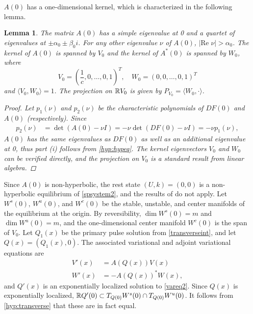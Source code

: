 \documentclass[10pt,reqno]{amsart}
\theoremstyle{plain}
\newtheorem{lemma}[theorem]{Lemma}
\theoremstyle{definition}
\theoremstyle{remark}
\numberwithin{theorem}{section}
\numberwithin{equation}{section}
\begin{document}
$A(0)$ has a one-dimensional kernel, which is characterized in the following lemma. 

\begin{lemma}\label{eigA0lemma}
The matrix $A(0)$ has a simple eigenvalue at 0 and a quartet of eigenvalues at $\pm \alpha_0 \pm \beta_0 i$. For any other eigenvalue $\nu$ of $A(0)$, $|\text{Re }\nu| > \alpha_0$. The kernel of $A(0)$ is spanned by $V_0$ and the kernel of $A^*(0)$ is spanned by $W_0$, where
\begin{equation}\label{V0W0}
V_0 = \left(\frac{1}{c}, 0, \dots, 0, 1\right)^T, \quad
W_0 = (0, 0, \dots, 0, 1)^T
\end{equation}
and $\langle V_0, W_0 \rangle = 1$. The projection on $\mathbb{R} V_0$ is given by $P_{V_0} = \langle W_0, \cdot \rangle$.
\begin{proof}
Let $p_1(\nu)$ and $p_2(\nu)$ be the characteristic polynomials of $DF(0)$ and $A(0)$ (respectively). Since
\begin{align*}
p_2(\nu) &= \det(A(0) - \nu I) = -\nu \det(DF(0) - \nu I) = -\nu p_1(\nu),
\end{align*}
$A(0)$ has the same eigenvalues as $DF(0)$ as well as an additional eigenvalue at 0, thus part (i) follows from \cref{hyp:hypeq}. The kernel eigenvectors $V_0$ and $W_0$ can be verified directly, and the projection on $V_0$ is a standard result from linear algebra.
\end{proof}
\end{lemma}

Since $A(0)$ is non-hyperbolic, the rest state $(U, k) = (0, 0)$ is a non-hyperbolic equilibrium of \cref{spsystem2}, and the results of \cite{Sandstede1998} do not apply. Let $W^s(0)$, $W^u(0)$, and $W^c(0)$ be the stable, unstable, and center manifolds of the equilibrium at the origin. By reversibility, $\dim W^s(0) = m$ and $\dim W^u(0) = m$, and the one-dimensional center manifold $W^c(0)$ is the span of $V_0$. Let $Q_1(x)$ be the primary pulse solution from \cref{transverseint}, and let $Q(x) = (Q_1(x), 0)$. The associated variational and adjoint variational equations are
\begin{align}
V'(x) &= A(Q(x)) V(x) \label{vareq2} \\
W'(x) &= -A(Q(x))^* W(x) \label{adjvareq2},
\end{align}
and $Q'(x)$ is an exponentially localized solution to \cref{vareq2}. Since $Q(x)$ is exponentially localized, $\mathbb{R} Q'(0) \subset T_{Q(0)}W^s(0) \cap T_{Q(0)}W^u(0)$. It follows from \cref{hyp:transverse} that these are in fact equal.
\end{document}
